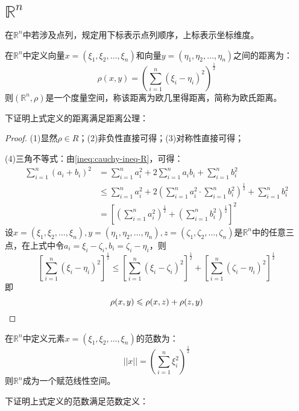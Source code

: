\section{$\mathbb{R}^n$}
在$\mathbb{R}^{n}$中若涉及点列，规定用下标表示点列顺序，上标表示坐标维度。
\begin{definition}
	在$\mathbb{R}^n$中定义向量$x=(\xi_1,\xi_2,\dots,\xi_n)$和向量$y=(\eta_1,\eta_2,\dots,\eta_n)$之间的距离为：
	\begin{equation*}
		\rho(x,y)=\left(\sum_{i=1}^n(\xi_i-\eta_i)^2\right)^{\frac{1}{2}}
	\end{equation*}
	则$(\mathbb{R}^n,\rho)$是一个度量空间，称该距离为欧几里得距离，简称为欧氏距离。
\end{definition}
下证明上式定义的距离满足距离公理：
\begin{proof}
	(1)显然$\rho\in R$；(2)非负性直接可得；(3)对称性直接可得；\par
	(4)三角不等式：由\cref{ineq:cauchy-ineq-R}，可得：
	\begin{align*}
		\sum_{i=1}^n(a_i+b_i)^2&=\sum_{i=1}^na_i^2+2\sum_{i=1}^na_ib_i+\sum_{i=1}^nb_i^2 \\
		&\leqslant\sum_{i=1}^na_i^2+2\left(\sum_{i=1}^na_i^2\cdot\sum_{i=1}^nb_i^2\right)^{\frac{1}{2}}+\sum_{i=1}^nb_i^2 \\
		&=\left[\left(\sum_{i=1}^na_i^2\right)^{\frac{1}{2}}+\left(\sum_{i=1}^nb_i^2\right)^{\frac{1}{2}}\right]^2
	\end{align*}
	设$x=(\xi_1,\xi_2,\dots,\xi_n),y=(\eta_1,\eta_2,\dots,\eta_n),z=(\zeta_1,\zeta_2,\dots,\zeta_n)$是$\mathbb{R}^n$中的任意三点，在上式中令$a_i=\xi_i-\zeta_i,b_i=\zeta_i-\eta_i$，则
	\begin{equation*}
		\left[\sum_{i=1}^n(\xi_i-\eta_i)^2\right]^{\frac{1}{2}}\leqslant	\left[\sum_{i=1}^n(\xi_i-\zeta_i)^2\right]^{\frac{1}{2}}+\left[\sum_{i=1}^n(\zeta_i-\eta_i)^2\right]^{\frac{1}{2}}
	\end{equation*}
	即
	\begin{equation*}
		\rho(x,y)\leqslant\rho(x,z)+\rho(z,y)\qedhere
	\end{equation*}
\end{proof}
\begin{definition}
	在$\mathbb{R}^n$中定义元素$x=(\xi_1,\xi_2,\dots,\xi_n)$的范数为：
	\begin{equation*}
		||x||=\left(\sum_{i=1}^n\xi_i^2\right)^{\frac{1}{2}}
	\end{equation*}
	则$\mathbb{R}^n$成为一个赋范线性空间。
\end{definition}
下证明上式定义的范数满足范数定义：
